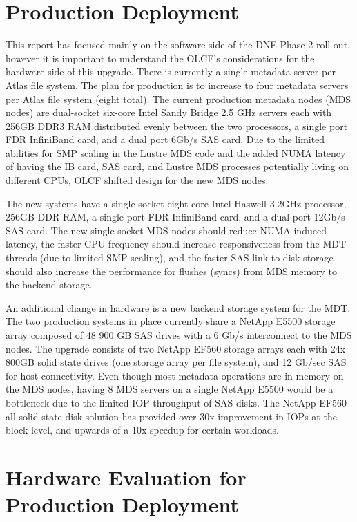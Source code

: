\documentclass[conference,compsoc]{IEEEtran}
\begin{document}
\section{Production Deployment}

This report has focused mainly on the software side of the DNE Phase 2 roll-out,
however it is important to understand the OLCF's considerations for the
hardware side of this upgrade. There is currently a single metadata server per
Atlas file system. The plan for production is to increase to four metadata
servers per Atlas file system (eight total). The current production metadata
nodes (MDS nodes) are dual-socket six-core Intel Sandy Bridge 2.5 GHz servers
each with 256GB DDR3 RAM distributed evenly between the two processors, a
single port FDR InfiniBand card, and a dual port 6Gb/s SAS card. Due to the
limited abilities for SMP scaling in the Lustre MDS code and the added NUMA
latency of having the IB card, SAS card, and Lustre MDS processes potentially
living on different CPUs, OLCF shifted design for the new MDS nodes.

The new systems have a single socket eight-core Intel Haswell 3.2GHz
processor, 256GB DDR RAM, a single port FDR InfiniBand card, and a dual port
12Gb/s SAS card. The new single-socket MDS nodes should reduce NUMA induced
latency, the faster CPU frequency should increase responsiveness from the MDT
threads (due to limited SMP scaling), and the faster SAS link to disk storage
should also increase the performance for flushes (syncs) from MDS memory to the
backend storage.

An additional change in hardware is a new backend storage system for the MDT. The two
production systems in place currently share a NetApp E5500 storage array
composed of 48 900 GB SAS drives with a 6 Gb/s interconnect to the MDS nodes. The
upgrade consists of two NetApp EF560 storage arrays each with 24x
800GB solid state drives (one storage array per file system), and 12 Gb/sec SAS
for host connectivity. Even though most metadata operations are in
memory on the MDS nodes, having 8 MDS servers on a single NetApp
E5500 would be a bottleneck due to the limited IOP throughput of SAS disks. The
NetApp EF560 all solid-state disk solution has provided over 30x improvement in
IOPs at the block level, and upwards of a 10x speedup for certain workloads.

\section{Hardware Evaluation for Production Deployment}
\end{document}
